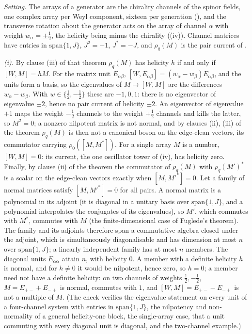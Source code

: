 \emph{Setting.} The arrays of a generator are the chirality channels of the spinor fields, one complex array per Weyl component, sixteen per generation (), and the transverse rotation about the generator acts on the array of channel $\alpha$ with weight $w_{\alpha} = \pm\tfrac12$, the helicity being minus the chirality ((iv)). Channel matrices have entries in $\mathrm{span}\{1, J\}$, $J^{2} = -1$, $J^{*} = -J$, and $\rho_{q}(M)$ is the pair current of .

\emph{(i).} By clause (iii) of that theorem $\rho_{q}(M)$ has helicity $h$ if and only if $[W, M] = hM$. For the matrix unit $E_{\alpha\beta}$, $[W, E_{\alpha\beta}] = (w_{\alpha} - w_{\beta})E_{\alpha\beta}$, and the units form a basis, so the eigenvalues of $M \mapsto [W, M]$ are the differences $w_{\alpha} - w_{\beta}$. With $w \in \{\tfrac12, -\tfrac12\}$ these are $-1, 0, 1$: there is no eigenvector of eigenvalue $\pm 2$, hence no pair current of helicity $\pm 2$. An eigenvector of eigenvalue $+1$ maps the weight $-\tfrac12$ channels to the weight $+\tfrac12$ channels and kills the latter, so $M^{2} = 0$; a nonzero nilpotent matrix is not normal, and by clauses (ii), (iii) of the theorem $\rho_{q}(M)$ is then not a canonical boson on the edge-clean vectors, its commutator carrying $\rho_{0}([M, M^{*}])$. For a single array $M$ is a number, $[W, M] = 0$: its current, the one oscillator tower of (iv), has helicity zero. Finally, by clause (ii) of the theorem the commutator of $\rho_{q}(M)$ with $\rho_{q}(M')^{*}$ is a scalar on the edge-clean vectors exactly when $[M, M'^{*}] = 0$. Let a family of normal matrices satisfy $[M, M'^{*}] = 0$ for all pairs. A normal matrix is a polynomial in its adjoint (it is diagonal in a unitary basis over $\mathrm{span}\{1, J\}$, and a polynomial interpolates the conjugates of its eigenvalues), so $M'$, which commutes with $M^{*}$, commutes with $M$ (the finite-dimensional case of Fuglede's theorem). The family and its adjoints therefore span a commutative algebra closed under the adjoint, which is simultaneously diagonalisable and has dimension at most $n$ over $\mathrm{span}\{1, J\}$; a linearly independent family has at most $n$ members. The diagonal units $E_{\alpha\alpha}$ attain $n$, with helicity $0$. A member with a definite helicity $h$ is normal, and for $h \neq 0$ it would be nilpotent, hence zero, so $h = 0$; a member need not have a definite helicity: on two channels of weights $\tfrac12, -\tfrac12$, $M = E_{+-} + E_{-+}$ is normal, commutes with $1$, and $[W, M] = E_{+-} - E_{-+}$ is not a multiple of $M$. (The check verifies the eigenvalue statement on every unit of a four-channel system with entries in $\mathrm{span}\{1, J\}$, the nilpotency and non-normality of a general helicity-one block, the single-array case, that a unit commuting with every diagonal unit is diagonal, and the two-channel example.)

